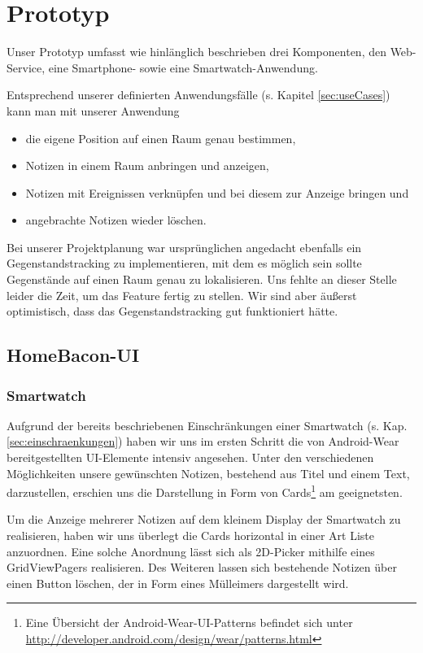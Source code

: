 \section{Prototyp}
\label{sec:prototyp}
Unser Prototyp umfasst wie hinlänglich beschrieben drei Komponenten, den Web-Service, eine Smartphone- sowie eine Smartwatch-Anwendung. 

Entsprechend unserer definierten Anwendungsfälle (s. Kapitel \ref{sec:useCases}) kann man mit unserer Anwendung
\begin{itemize}
\item{die eigene Position auf einen Raum genau bestimmen,}
\item{Notizen in einem Raum anbringen und anzeigen,}
\item{Notizen mit Ereignissen verknüpfen und bei diesem zur Anzeige bringen und}
\item{angebrachte Notizen wieder löschen.} 
\end{itemize}

Bei unserer Projektplanung war ursprünglichen angedacht ebenfalls ein Gegenstandstracking zu implementieren, mit dem es möglich sein sollte Gegenstände auf einen Raum genau zu lokalisieren. Uns fehlte an dieser Stelle leider die Zeit, um das Feature fertig zu stellen. Wir sind aber äußerst optimistisch, dass das Gegenstandstracking gut funktioniert hätte.

\subsection{HomeBacon-UI}

\subsubsection{Smartwatch}
Aufgrund der bereits beschriebenen Einschränkungen einer Smartwatch (s. Kap. \ref{sec:einschraenkungen}) haben wir uns im ersten Schritt die von Android-Wear bereitgestellten UI-Elemente intensiv angesehen. Unter den verschiedenen Möglichkeiten unsere gewünschten Notizen, bestehend aus Titel und einem Text, darzustellen, erschien uns die Darstellung in Form von Cards\footnote{Eine Übersicht der Android-Wear-UI-Patterns befindet sich unter \url{http://developer.android.com/design/wear/patterns.html}} am geeignetsten.

Um die Anzeige mehrerer Notizen auf dem kleinem Display der Smartwatch zu realisieren, haben wir uns überlegt die Cards horizontal in einer Art Liste anzuordnen. Eine solche Anordnung lässt sich als 2D-Picker mithilfe eines GridViewPagers realisieren. Des Weiteren lassen sich bestehende Notizen über einen Button löschen, der in Form eines Mülleimers dargestellt wird. 

